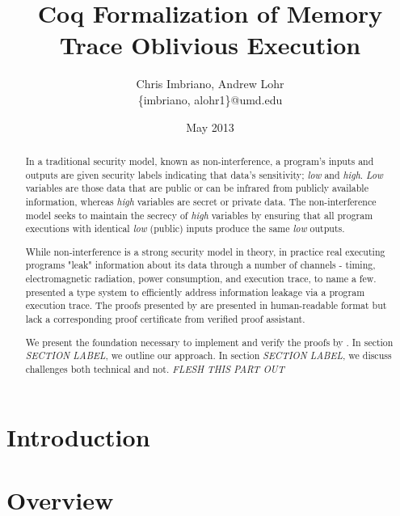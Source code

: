 \documentclass[10pt,  onecolumn]{article}
\begin{document}
\title{Coq Formalization of Memory Trace Oblivious Execution}
\author{ Chris Imbriano, Andrew Lohr \\
\{imbriano,  alohr1\}@umd.edu }
\date{May 2013}

\maketitle



\begin{abstract}
In a traditional security model, known as non-interference, a program's inputs and outputs are given security labels indicating that data's sensitivity; \emph{low} and \emph{high}.
\emph{Low} variables are those data that are public or can be infrared from publicly available information, whereas \emph{high} variables are secret or private data.
The non-interference model seeks to maintain the secrecy of \emph{high} variables by ensuring that all program executions with identical \emph{low} (public) inputs produce the same \emph{low} outputs.

While non-interference is a strong security model in theory, in practice real executing programs "leak" information about its data through a number of channels - timing, electromagnetic radiation, power consumption, and execution trace, to name a few.
\citeauthor{mtope} presented a type system to efficiently address information leakage via a program execution trace.
The proofs presented by \citeauthor{mtope} are presented in human-readable format but lack a corresponding proof certificate from verified proof assistant.

We present the foundation necessary to implement and verify the proofs by \citeauthor{mtope}.
In section \emph{SECTION LABEL}, we outline our approach.
In section \emph{SECTION LABEL}, we discuss challenges both technical and not.
\emph{FLESH THIS PART OUT}

\end{abstract}

\section{Introduction}
\label{sec:introduction}


\section {Overview}
\end{document}
